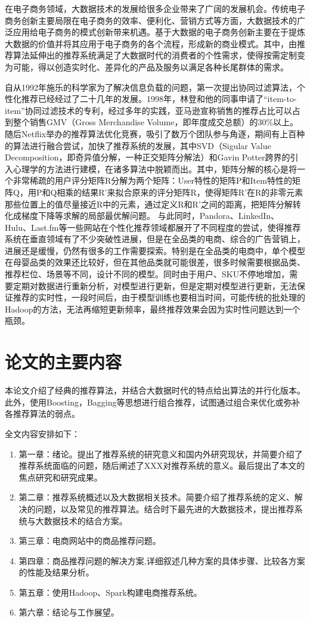 在电子商务领域，大数据技术的发展给很多企业带来了广阔的发展机会。传统电子商务创新主要局限在电子商务的效率、便利化、营销方式等方面，大数据技术的广泛应用给电子商务的模式创新带来机遇。基于大数据的电子商务创新主要在于提炼大数据的价值并将其应用于电子商务的各个流程，形成新的商业模式\cite{大数据背景下电子商务的价值创造与模式创新}。其中，由推荐算法延伸出的推荐系统满足了大数据时代的消费者的个性需求，使得按需定制变为可能，得以创造实时化、差异化的产品及服务以满足各种长尾群体的需求。

自从1992年施乐的科学家为了解决信息负载的问题，第一次提出协同过滤算法，个性化推荐已经经过了二十几年的发展。1998年，林登和他的同事申请了“item-to-item”协同过滤技术的专利，经过多年的实践，亚马逊宣称销售的推荐占比可以占到整个销售GMV（Gross Merchandise Volume，即年度成交总额）的30\%以上。随后Netflix举办的推荐算法优化竞赛，吸引了数万个团队参与角逐，期间有上百种的算法进行融合尝试，加快了推荐系统的发展，其中SVD（Sigular Value Decomposition，即奇异值分解，一种正交矩阵分解法）和Gavin Potter跨界的引入心理学的方法进行建模，在诸多算法中脱颖而出。其中，矩阵分解的核心是将一个非常稀疏的用户评分矩阵R分解为两个矩阵：User特性的矩阵P和Item特性的矩阵Q，用P和Q相乘的结果R'来拟合原来的评分矩阵R，使得矩阵R'在R的非零元素那些位置上的值尽量接近R中的元素，通过定义R和R'之间的距离，把矩阵分解转化成梯度下降等求解的局部最优解问题。
与此同时，Pandora、LinkedIn、Hulu、Last.fm等一些网站在个性化推荐领域都展开了不同程度的尝试，使得推荐系统在垂直领域有了不少突破性进展，但是在全品类的电商、综合的广告营销上，进展还是缓慢，仍然有很多的工作需要探索。特别是在全品类的电商中，单个模型在母婴品类的效果还比较好，但在其他品类就可能很差，很多时候需要根据品类、推荐栏位、场景等不同，设计不同的模型。同时由于用户、SKU不停地增加，需要定期对数据进行重新分析，对模型进行更新，但是定期对模型进行更新，无法保证推荐的实时性，一段时间后，由于模型训练也要相当时间，可能传统的批处理的Hadoop的方法，无法再缩短更新频率，最终推荐效果会因为实时性问题达到一个瓶颈。


\section{论文的主要内容}
本论文介绍了经典的推荐算法，并结合大数据时代的特点给出算法的并行化版本。此外，使用Boosting，Bagging等思想进行组合推荐，试图通过组合来优化或弥补各推荐算法的弱点。

全文内容安排如下：
\begin{enumerate}
\item 第一章：绪论。提出了推荐系统的研究意义和国内外研究现状，并简要介绍了推荐系统面临的问题，随后阐述了XXX对推荐系统的意义。最后提出了本文的焦点研究和研究成果。
\item 第二章：推荐系统概述以及大数据相关技术。简要介绍了推荐系统的定义、解决的问题，以及常见的推荐算法。结合时下最先进的大数据技术，提出推荐系统与大数据技术的结合方案。
\item 第三章：电商网站中的商品推荐问题。
\item 第四章：商品推荐问题的解决方案,详细叙述几种方案的具体步骤、比较各方案的性能及结果分析。
\item 第五章：使用Hadoop、Spark构建电商推荐系统。
\item 第六章：结论与工作展望。
\end{enumerate}

\ifx\usechapbib\empty
\nocite{BSTcontrol}
\setcounter{NAT@ctr}{0}


\fi
